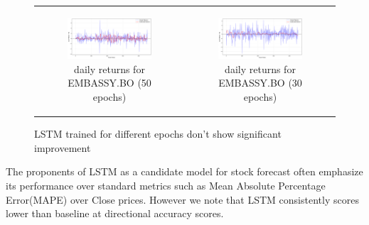 \documentclass[11pt]{article}
\begin{document}
\begin{figure}[h!]
    \centering
    \begin{tabular}{cc}
        \begin{subfigure}[b]{0.48\textwidth}
            \centering
            \includegraphics[width=\linewidth]{figures/lstm/lstm_embassy.png}
            \caption{daily returns for EMBASSY.BO (50 epochs)}
            \label{fig:1a}
        \end{subfigure} &
        \begin{subfigure}[b]{0.48\textwidth}
            \centering
            \includegraphics[width=\linewidth]{figures/lstm/lstm_mindspace_epoch30.png}
            \caption{daily returns for EMBASSY.BO (30 epochs)}
            \label{fig:1b}
        \end{subfigure} \\
    \end{tabular}
    \label{fig:4x2grid}
    \caption{LSTM trained for different epochs don't show significant improvement}
\end{figure}

The proponents of LSTM as a candidate model for stock forecast often emphasize its performance over standard metrics such as Mean Absolute Percentage Error(MAPE) over Close prices. However we note that LSTM consistently scores lower than baseline at directional accuracy scores.\cite{3}
\end{document}

